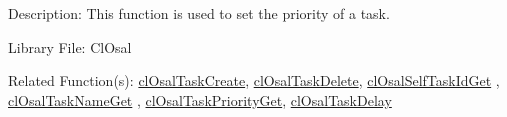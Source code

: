 \begin{Desc}
\item[Description:]This function is used to set the priority of a task.\end{Desc}
\begin{Desc}
\item[Library File:]Cl\-Osal\end{Desc}
\begin{Desc}
\item[Related Function(s):]\hyperlink{pageosal103}{cl\-Osal\-Task\-Create}, \hyperlink{pageosal104}{cl\-Osal\-Task\-Delete}, 
\hyperlink{pageosal105}{cl\-Osal\-Self\-Task\-Id\-Get} , \hyperlink{pageosal106}{cl\-Osal\-Task\-Name\-Get} , 
\hyperlink{pageosal107}{cl\-Osal\-Task\-Priority\-Get}, \hyperlink{pageosal109}{cl\-Osal\-Task\-Delay} \end{Desc}

\newpage
